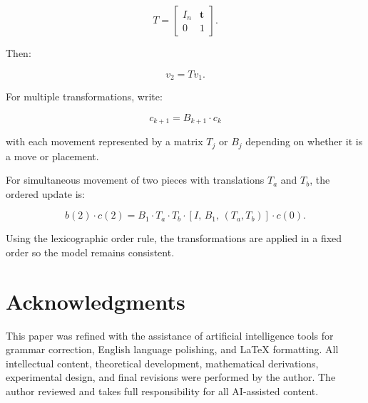 \documentclass[11pt,a4paper]{article}
\theoremstyle{plain}
\theoremstyle{definition}
\begin{document}
\vspace{0.5em}

\[
T =
\begin{bmatrix}
I_n & \mathbf{t} \\
0 & 1
\end{bmatrix}.
\]

\vspace{0.5em}

Then:

\vspace{0.5em}

\[
v_2 = T v_1.
\]

\vspace{0.5em}

For multiple transformations, write:

\vspace{0.5em}

\[
c_{k+1} = B_{k+1} \cdot c_k
\]

\vspace{0.5em}

with each movement represented by a matrix \(T_j\) or \(B_j\) depending on whether it is a move or placement.

\vspace{0.5em}

For simultaneous movement of two pieces with translations \(T_a\) and \(T_b\), the ordered update is:

\vspace{0.5em}

\[
b(2) \cdot c(2) = B_1 \cdot T_a \cdot T_b \cdot [I,\, B_1,\, (T_a, T_b)] \cdot c(0).
\]

\vspace{0.5em}

Using the lexicographic order rule, the transformations are applied in a fixed order so the model remains consistent.

\vspace{0.5em}

\section*{Acknowledgments}

\vspace{0.5em}

This paper was refined with the assistance of artificial intelligence tools for grammar correction, English language polishing, and LaTeX formatting. All intellectual content, theoretical development, mathematical derivations, experimental design, and final revisions were performed by the author. The author reviewed and takes full responsibility for all AI-assisted content.
\end{document}
